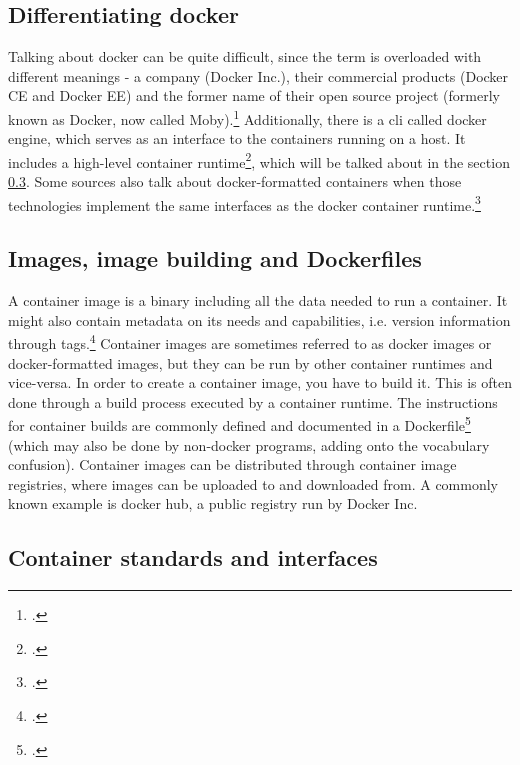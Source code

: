 \subsection{Differentiating docker}
Talking about docker can be quite difficult, since the term is overloaded with different meanings - a company (Docker Inc.), their commercial products (Docker CE and Docker EE) and the former name of their open source project (formerly known as Docker, now called Moby).\footcite[][, section 'What is Moby?']{dockerMoby}
Additionally, there is a \gls{cli} called docker engine, which serves as an interface to the containers running on a host. It includes a high-level container runtime\footcite[][, section 'Develop, Ship and Run Any Application, Anywhere']{dockerEngine}, which will be talked about in the section \ref{runtimes}.
Some sources also talk about docker-formatted containers when those technologies implement the same interfaces as the docker container runtime.\footcite[][, section '1.11. Working with Docker formatted containers']{dockerFormatted}

\subsection{Images, image building and Dockerfiles}
A container image is a binary including all the data needed to run a container. It might also contain metadata on its needs and capabilities, i.e. version information through tags.\footcite[][, section 'Docker Images']{redhatImages}
Container images are sometimes referred to as docker images or docker-formatted images, but they can be run by other container runtimes and vice-versa.
In order to create a container image, you have to build it. This is often done through a build process executed by a container runtime. The instructions for container builds are commonly defined and documented in a Dockerfile\footcite[][, section 'Dockerfile reference']{dockerfileDocs} (which may also be done by non-docker programs, adding onto the vocabulary confusion).
Container images can be distributed through container image registries, where images can be uploaded to and downloaded from. A commonly known example is docker hub, a public registry run by Docker Inc.

\subsection{Container standards and interfaces} \label{runtimes}

